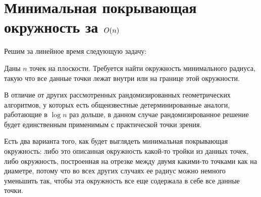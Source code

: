 \chapter{Минимальная покрывающая окружность за $O(n)$} \label{min-circle}

Решим за линейное время следующую задачу:

\begin{problem}
    Даны $n$ точек на плоскости. Требуется найти окружность минимального радиуса, такую что все данные точки лежат внутри или на границе этой окружности.
\end{problem}

В отличие от других рассмотренных рандомизированных геометрических алгоритмов, у которых есть общеизвестные детерминированные аналоги, работающие в $\log n$ раз дольше, в данном случае рандомизированное решение будет единственным применимым с практической точки зрения.

Есть два варианта того, как будет выглядеть минимальная покрывающая окружность: либо это описанная окружность какой-то тройки из данных точек, либо окружность, построенная на отрезке между двумя какими-то точками как на диаметре, потому что во всех других случаях ее радиус можно немного уменьшить так, чтобы эта окружность все еще содержала в себе все данные точки.


